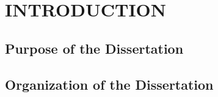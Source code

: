 %
%
%
\pagestyle{plain} %
\setcounter{page}{1}

\chapter{\uppercase {Introduction}}



\section{Purpose of the Dissertation}
\label{sec::Introduction_Purpose}







\section{Organization of the Dissertation}
\label{sec::Introduction_Organization}
